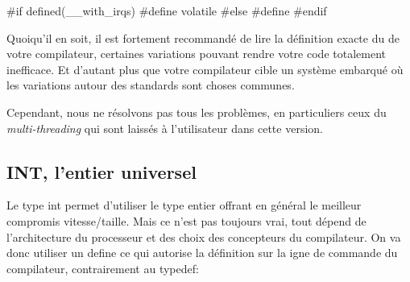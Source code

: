 \documentclass{scrartcl}%
\begin{document}
\nwenddocs{}\endmoddef\nwstartdeflinemarkup{}\nwenddeflinemarkup

#if defined(__with_irqs)
  #define  volatile
#else
  #define 
#endif

\eatline
{}\nwendcode{}Quoiqu'il en soit, il est fortement recommandé de lire la définition exacte du {\Tt{}\nwendquote} de votre compilateur, certaines variations pouvant rendre votre code totalement inefficace. Et d'autant plus que votre compilateur cible un système embarqué où les variations autour des standards sont choses communes.

Cependant, nous ne résolvons pas tous les problèmes, en particuliers ceux du \emph{multi-threading} qui sont laissés à l'utilisateur dans cette version.

\subsection{INT, l'entier universel}
Le type {\Tt{}int\nwendquote} permet d'utiliser le type entier offrant en général le meilleur compromis vitesse/taille. Mais ce n'est pas toujours vrai, tout dépend de l'architecture du processeur et des choix des concepteurs du compilateur. On va donc utiliser un {\Tt{}define\nwendquote} ce qui autorise la définition sur la igne de commande du compilateur, contrairement au {\Tt{}typedef\nwendquote}:

\nwenddocs{}\endmoddef\nwstartdeflinemarkup{}\nwenddeflinemarkup
\end{document}
